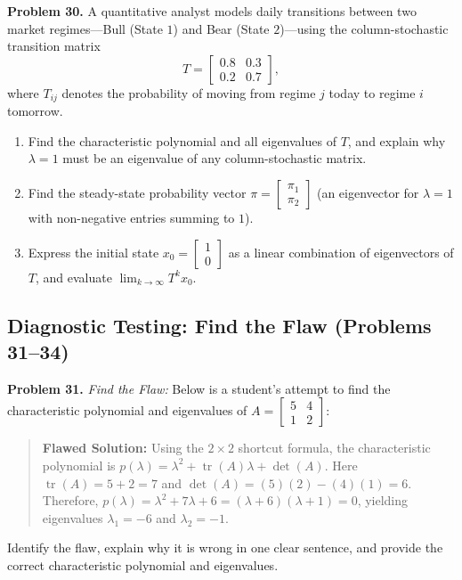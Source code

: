 \documentclass[11pt, letterpaper]{article}
\theoremstyle{definition}
\theoremstyle{remark}
\begin{document}
\noindent\textbf{Problem 30.} A quantitative analyst models daily transitions between two market regimes—Bull (State $1$) and Bear (State $2$)—using the column-stochastic transition matrix
\[
T = \begin{bmatrix} 0.8 & 0.3 \\ 0.2 & 0.7 \end{bmatrix},
\]
where $T_{ij}$ denotes the probability of moving from regime $j$ today to regime $i$ tomorrow.
\begin{enumerate}[label=(\alph*), topsep=3pt, itemsep=3pt]
    \item Find the characteristic polynomial and all eigenvalues of $T$, and explain why $\lambda = 1$ must be an eigenvalue of any column-stochastic matrix.
    \item Find the steady-state probability vector $\pi = \begin{bmatrix} \pi_1 \\ \pi_2 \end{bmatrix}$ (an eigenvector for $\lambda = 1$ with non-negative entries summing to $1$).
    \item Express the initial state $x_0 = \begin{bmatrix} 1 \\ 0 \end{bmatrix}$ as a linear combination of eigenvectors of $T$, and evaluate $\lim_{k \to \infty} T^k x_0$.
\end{enumerate}

\subsection{Diagnostic Testing: Find the Flaw (Problems 31--34)}

\noindent\textbf{Problem 31.} \textit{Find the Flaw:} Below is a student's attempt to find the characteristic polynomial and eigenvalues of $A = \begin{bmatrix} 5 & 4 \\ 1 & 2 \end{bmatrix}$:
\begin{quote}
\textbf{Flawed Solution:} Using the $2 \times 2$ shortcut formula, the characteristic polynomial is $p(\lambda) = \lambda^2 + \operatorname{tr}(A)\lambda + \det(A)$. Here $\operatorname{tr}(A) = 5 + 2 = 7$ and $\det(A) = (5)(2) - (4)(1) = 6$. Therefore, $p(\lambda) = \lambda^2 + 7\lambda + 6 = (\lambda + 6)(\lambda + 1) = 0$, yielding eigenvalues $\lambda_1 = -6$ and $\lambda_2 = -1$.
\end{quote}
Identify the flaw, explain why it is wrong in one clear sentence, and provide the correct characteristic polynomial and eigenvalues.
\end{document}
